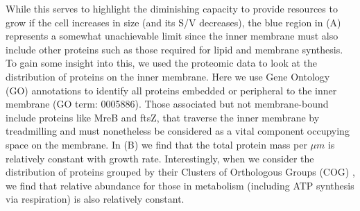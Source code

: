 While this serves to highlight the diminishing capacity to provide resources to
grow if the cell increases in size (and its S/V decreases), the blue region in
(A) represents a somewhat unachievable limit since the inner
membrane must also include other proteins such as those required for lipid and
membrane synthesis. To gain some insight into this, we used the proteomic data
to look at the distribution of proteins on the inner membrane. Here we use Gene
Ontology (GO) annotations \citep{ashburner2000,thegeneOntologyconsortium2018} to
identify all proteins embedded or peripheral to the inner membrane (GO term:
0005886). Those associated but not membrane-bound include proteins like MreB and
ftsZ, that traverse the inner membrane by treadmilling and must nonetheless be
considered as a vital component occupying space on the membrane. In
(B) we find that the total protein mass per $\mu m$ is
relatively constant with growth rate. Interestingly, when we consider the
distribution of proteins grouped by their Clusters of Orthologous Groups (COG)
\citep{tatusov2000}, we find that relative abundance for those in metabolism
(including ATP synthesis via respiration) is also relatively constant.




